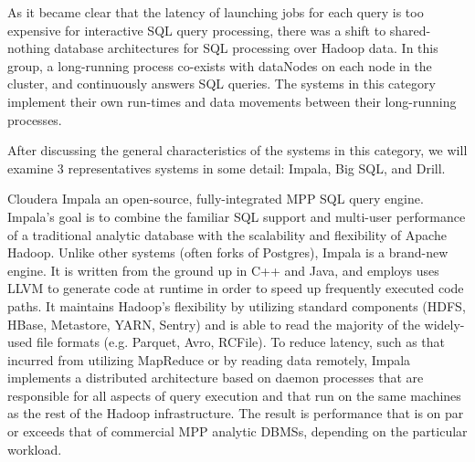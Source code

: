 \documentclass{vldb}
\begin{document}
As it became clear that the latency of launching jobs for each query is too expensive for interactive SQL query processing, there was a shift to shared-nothing database architectures for SQL processing over Hadoop data. In this group, a long-running process co-exists with dataNodes on each node in the cluster, and continuously answers SQL queries. The systems in this category implement their own run-times and data movements between their long-running processes. 

After discussing the general characteristics of the systems in this category, we will examine 3 representatives systems in some detail: Impala, Big SQL, and Drill. 

Cloudera Impala \cite{Kornacker+15} an open-source, fully-integrated MPP SQL query engine. Impala's goal is to combine the familiar SQL support and multi-user performance of a traditional analytic database with the scalability and flexibility of Apache Hadoop. Unlike other systems (often forks of Postgres), Impala is a brand-new engine. It is written from the ground up in C++ and Java, and employs uses LLVM to generate code at runtime in order to speed up frequently executed code paths. It maintains Hadoop's flexibility by utilizing standard components (HDFS, HBase, Metastore, YARN, Sentry) and is able to read the majority of the widely-used file formats (e.g. Parquet, Avro, RCFile). To reduce latency, such as that incurred from utilizing MapReduce or by reading data remotely, Impala implements a distributed architecture based on daemon processes that are responsible for all aspects of query execution and that run on the same machines as the rest of the Hadoop infrastructure. The result is performance that is on par or exceeds that of commercial MPP analytic DBMSs, depending on the particular workload.
\end{document}
